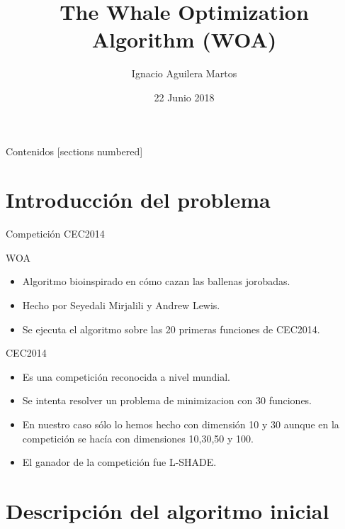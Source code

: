 \documentclass[10pt]{beamer}
\title{The Whale Optimization Algorithm (WOA)}
\author{Ignacio Aguilera Martos}
\date{22 Junio 2018}
\institute{Metaheurísticas}
\begin{document}
\maketitle

\begin{frame}[fragile]{Contenidos}
  [sections numbered]
  \tableofcontents[hideallsubsections]
\end{frame}

\section{Introducción del problema}

	\begin{frame}[fragile]{Competición CEC2014}
		\vspace{10px}
		\pause
		\begin{block}{WOA}
			\begin{itemize}
				\item Algoritmo bioinspirado en cómo cazan las ballenas jorobadas.
				\item Hecho por Seyedali Mirjalili y Andrew Lewis.
				\item Se ejecuta el algoritmo sobre las 20 primeras funciones de CEC2014.
			\end{itemize}
		\end{block}
		\begin{block}{CEC2014}
			\begin{itemize}
				\item Es una competición reconocida a nivel mundial.
				\item Se intenta resolver un problema de minimizacion con 30 funciones.
				\item En nuestro caso sólo lo hemos hecho con dimensión 10 y 30 aunque en la competición se hacía con dimensiones 10,30,50 y 100.
				\item El ganador de la competición fue L-SHADE.
			\end{itemize}
		\end{block}
	\end{frame}

\section{Descripción del algoritmo inicial}
\end{document}
